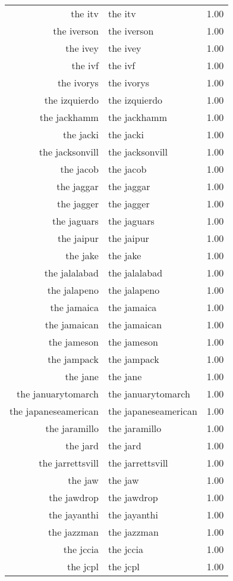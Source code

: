 \begin{table}[ht]
\begin{tabular}{rlr}
  the itv & the itv & 1.00 \\ 
  the iverson & the iverson & 1.00 \\ 
  the ivey & the ivey & 1.00 \\ 
  the ivf & the ivf & 1.00 \\ 
  the ivorys & the ivorys & 1.00 \\ 
  the izquierdo & the izquierdo & 1.00 \\ 
  the jackhamm & the jackhamm & 1.00 \\ 
  the jacki & the jacki & 1.00 \\ 
  the jacksonvill & the jacksonvill & 1.00 \\ 
  the jacob & the jacob & 1.00 \\ 
  the jaggar & the jaggar & 1.00 \\ 
  the jagger & the jagger & 1.00 \\ 
  the jaguars & the jaguars & 1.00 \\ 
  the jaipur & the jaipur & 1.00 \\ 
  the jake & the jake & 1.00 \\ 
  the jalalabad & the jalalabad & 1.00 \\ 
  the jalapeno & the jalapeno & 1.00 \\ 
  the jamaica & the jamaica & 1.00 \\ 
  the jamaican & the jamaican & 1.00 \\ 
  the jameson & the jameson & 1.00 \\ 
  the jampack & the jampack & 1.00 \\ 
  the jane & the jane & 1.00 \\ 
  the januarytomarch & the januarytomarch & 1.00 \\ 
  the japaneseamerican & the japaneseamerican & 1.00 \\ 
  the jaramillo & the jaramillo & 1.00 \\ 
  the jard & the jard & 1.00 \\ 
  the jarrettsvill & the jarrettsvill & 1.00 \\ 
  the jaw & the jaw & 1.00 \\ 
  the jawdrop & the jawdrop & 1.00 \\ 
  the jayanthi & the jayanthi & 1.00 \\ 
  the jazzman & the jazzman & 1.00 \\ 
  the jccia & the jccia & 1.00 \\ 
  the jcpl & the jcpl & 1.00 \\ 

\end{tabular}
\end{table}
